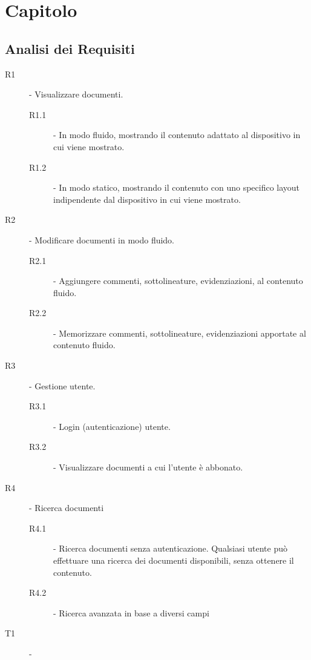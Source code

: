 \newpage
\chapter{Capitolo}

\section{Analisi dei Requisiti}
\begin{description}
    \item[R1] - Visualizzare documenti.
    \begin{description}
        \item[R1.1] - In modo fluido, mostrando il contenuto adattato al dispositivo in cui viene mostrato.
        \item[R1.2] - In modo statico, mostrando il contenuto con uno specifico layout indipendente dal dispositivo in cui viene mostrato.
    \end{description}
    \item[R2] - Modificare documenti in modo fluido.
    \begin{description}
        \item[R2.1] - Aggiungere commenti, sottolineature, evidenziazioni, al contenuto fluido.
        \item[R2.2] - Memorizzare commenti, sottolineature, evidenziazioni apportate al contenuto fluido.
    \end{description}
    \item[R3] - Gestione utente.
    \begin{description}
        \item[R3.1] - Login (autenticazione) utente.
        \item[R3.2] - Visualizzare documenti a cui l'utente è abbonato.
    \end{description}
    \item[R4] - Ricerca documenti
    \begin{description}
        \item[R4.1] - Ricerca documenti senza autenticazione. Qualsiasi utente può effettuare una ricerca dei documenti disponibili, senza ottenere il contenuto.
        \item[R4.2] - Ricerca avanzata in base a diversi campi %
    \end{description}
\end{description}


\begin{description}
    \item[T1] - 
\end{description}